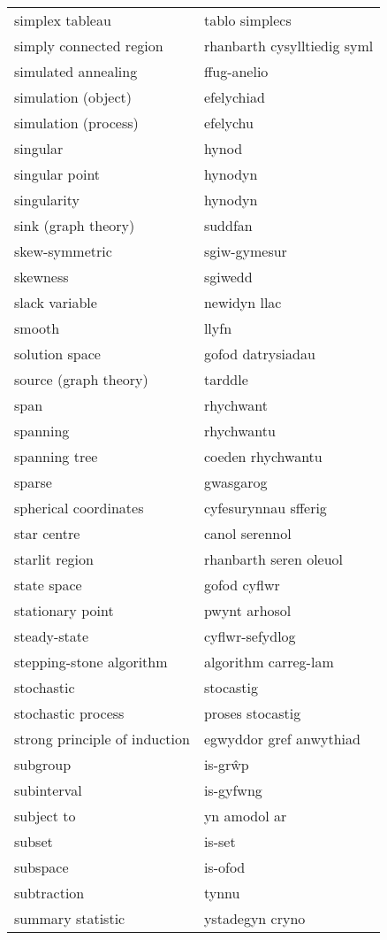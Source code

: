 \begin{supertabular}{p{0.22\textwidth}p{0.22\textwidth}}
simplex tableau & tablo simplecs \\
simply connected region & rhanbarth cysylltiedig syml \\
simulated annealing & ffug-anelio \\
simulation (object) & efelychiad \\
simulation (process) & efelychu \\
singular & hynod \\
singular point & hynodyn \\
singularity & hynodyn \\
sink (graph theory) & suddfan \\
skew-symmetric & sgiw-gymesur \\
skewness & sgiwedd \\
slack variable & newidyn llac \\
smooth & llyfn \\
solution space & gofod datrysiadau \\
source (graph theory) & tarddle \\
span & rhychwant \\
spanning & rhychwantu \\
spanning tree & coeden rhychwantu \\
sparse & gwasgarog \\
spherical coordinates & cyfesurynnau sfferig \\
star centre & canol serennol \\
starlit region & rhanbarth seren oleuol \\
state space & gofod cyflwr \\
stationary point & pwynt arhosol \\
steady-state & cyflwr-sefydlog \\
stepping-stone algorithm & algorithm carreg-lam \\
stochastic & stocastig \\
stochastic process & proses stocastig \\
strong principle of induction & egwyddor gref anwythiad \\
subgroup & is-grŵp \\
subinterval & is-gyfwng \\
subject to & yn amodol ar \\
subset & is-set \\
subspace & is-ofod \\
subtraction & tynnu \\
summary statistic & ystadegyn cryno \\

\end{supertabular}
